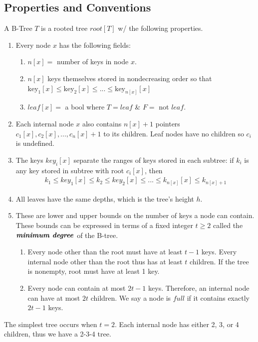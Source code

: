 \documentclass{article}
\begin{document}
\subsection{Properties and Conventions}
A B-Tree $T$ is a rooted tree $root[T]$ w/ the following properties.\\
\begin{enumerate}
    \item Every node $x$ has the following fields:
    \begin{enumerate}
        \item $n[x] = $ number of keys in node $x$.
        \item $n[x]$ keys themselves stored in nondecreasing order so that $\text{key}_1[x] \leq \text{key}_2[x] \leq ... \leq \text{key}_{n[x]}[x]$
        \item $leaf[x] = $ a bool where $T = leaf$ \& $F =$ not $leaf$.
    \end{enumerate}
    \item Each internal node $x$ also contains $n[x] + 1$ pointers $c_1[x], c_2[x],...,c_n[x]+1$ to its children. Leaf nodes have no children so $c_i$ is undefined.
    \item The keys $key_i[x]$ separate the ranges of keys stored in each subtree: if $k_i$ is any key stored in subtree with root $c_i[x]$, then
    \begin{align*}
        k_1 \leq key_1[x] \leq k_2 \leq key_2[x] \leq ... \leq k_{n[x]}[x] \leq k_{n[x]+1}
    \end{align*}
    \item All leaves have the same depths, which is the tree's height $h$.
    \item These are lower and upper bounds on the number of keys a node can contain. These bounds can be expressed in terms of a fixed integer $t \geq 2$ called the $\textbf{\textit{minimum degree}}$ of the B-tree.
    \begin{enumerate}
        \item Every node other than the root must have at least $t-1$ keys. Every internal node other than the root thus has at least $t$ children. If the tree is nonempty, root must have at least 1 key.
        \item Every node can contain at most $2t-1$ keys. Therefore, an internal node can have at most $2t$ children. We say a node is $full$ if it contains exactly $2t-1$ keys.
    \end{enumerate}
\end{enumerate}
The simplest tree occurs when $t=2$. Each internal node has either 2, 3, or 4 children, thus we have a 2-3-4 tree.\\
\end{document}
